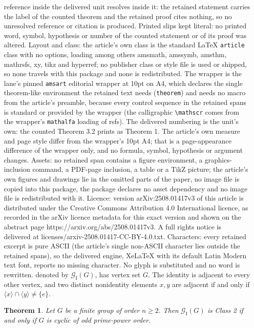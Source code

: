 \documentclass[10pt,a4paper]{amsart}
\newtheorem{theorem}{Theorem}
\begin{document}
reference inside the delivered unit resolves inside it: the retained statement carries the label of the counted theorem and the retained proof cites nothing, so no unresolved reference or citation is produced. Printed slips kept literal: no printed word, symbol, hypothesis or number of the counted statement or of its proof was altered. Layout and class: the article's own class is the standard LaTeX \texttt{article} class with no options, loading among others amsmath, amssymb, amsthm, mathrsfs, xy, tikz and hyperref; no publisher class or style file is used or shipped, so none travels with this package and none is redistributed. The wrapper is the lane's pinned \texttt{amsart} editorial wrapper at 10pt on A4, which declares the single theorem-like environment the retained text needs (\texttt{theorem}) and needs no macro from the article's preamble, because every control sequence in the retained spans is standard or provided by the wrapper (the calligraphic \texttt{\textbackslash mathscr} comes from the wrapper's \texttt{mathalfa} loading of rsfs). The delivered numbering is the unit's own: the counted Theorem 3.2 prints as Theorem 1. The article's own measure and page style differ from the wrapper's 10pt A4; that is a page-appearance difference of the wrapper only, and no formula, symbol, hypothesis or argument changes. Assets: no retained span contains a figure environment, a graphics-inclusion command, a PDF-page inclusion, a table or a TikZ picture; the article's own figures and drawings lie in the omitted parts of the paper, no image file is copied into this package, the package declares no asset dependency and no image file is redistributed with it. Licence: version arXiv:2508.01417v3 of this article is distributed under the Creative Commons Attribution 4.0 International licence, as recorded in the arXiv licence metadata for this exact version and shown on the abstract page https://arxiv.org/abs/2508.01417v3. A full rights notice is delivered at licenses/arxiv-2508.01417-CC-BY-4.0.txt. Characters: every retained excerpt is pure ASCII (the article's single non-ASCII character lies outside the retained spans), so the delivered engine, XeLaTeX with its default Latin Modern text font, reports no missing character. No glyph is substituted and no word is rewritten.
denoted by $\mathscr{G}_{\mathrm{I}}(G)$, has vertex set $G$. The identity is
adjacent to every other vertex, and two distinct nonidentity elements $x,y$
are adjacent if and only if
$\langle x\rangle\cap\langle y\rangle\neq\{e\}$.

\begin{theorem}
\label{thm:intersection-power}
Let $G$ be a finite group of order $n\geq 2$. Then
$\mathscr{G}_{\mathrm{I}}(G)$ is Class 2 if and only if  $G$ is cyclic of odd prime-power order. 
\end{theorem}
\end{document}
